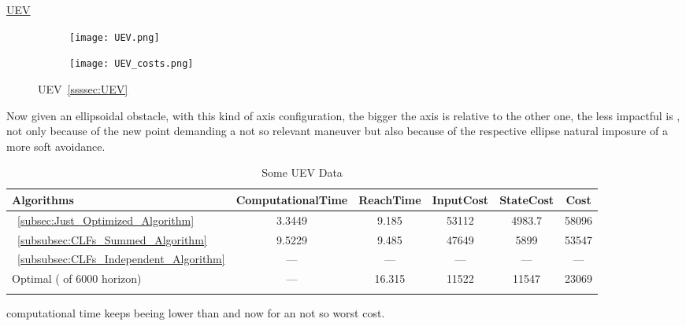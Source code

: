  \newpage %

\underline{UEV}
\label{ssssec:UEV_experiments} %

 \begin{figure}[htbp]
  \begin{subfigure}{0.6\textwidth}
    \centering
    \texttt{[image: UEV.png]}
  \label{fig:UEV_CostEvol}
  \end{subfigure}
  \begin{subfigure}{0.59\textwidth}
    \centering
    \texttt{[image: UEV\_costs.png]}
  \label{fig:UEV_trajectory}
  \end{subfigure}
  \caption{UEV~\ref{ssssec:UEV}}
\label{fig:UEVTrajectory_and_CostEvol}
\end{figure}

Now given an ellipsoidal obstacle, with this kind of axis configuration, the bigger the axis is relative to the other one, the less impactful is , not only because of the new point demanding a not so relevant maneuver but also because of the respective ellipse  natural imposure of a more soft avoidance. 


 \bgroup
 \begin{xltabular}{\textwidth}{|l|ccccc|}
   \toprule
   Algorithms   & ComputationalTime  & ReachTime  & InputCost   & StateCost & Cost           \\
   \midrule
    ~\ref{subsec:Just_Optimized_Algorithm}           & 3.3449 & 9.185  & 53112 & 4983.7 & 58096 \\
    ~\ref{subsubsec:CLFs_Summed_Algorithm}        & 9.5229  & 9.485     & 47649 & 5899 & 53547 \\
    ~\ref{subsubsec:CLFs_Independent_Algorithm}   & ---   & ---      & ---  & ---  & ---  \\
    Optimal ( of 6000 horizon)                        & ---    & 16.315 & 11522  & 11547 & 23069 \\
    \midrule
    \caption{Some UEV Data}
   \label{tab:Some_UEV_Data}\\
   \end{xltabular}
 \egroup


  computational time keeps beeing lower than  and now for an not so worst cost.


